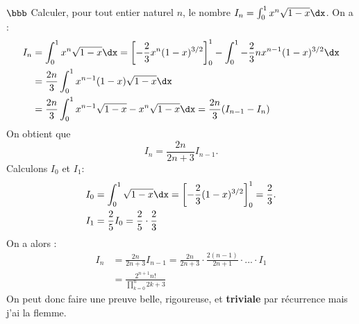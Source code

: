 \documentclass[11pt]{article}
\begin{document}
\begin{exercice}{$\bbb$}{}
    Calculer, pour tout entier naturel $n$, le nombre $I_n=\int_0^1{x^n\sqrt{1-x}\dx}$.
    \tcblower
    On a :
    \begin{align*}
        I_n &= \int_0^1x^n\sqrt{1-x}\dx=\left[-\frac{2}{3}x^n(1-x)^{3/2}\right]_0^1-\int_0^1{-\frac{2}{3}nx^{n-1}(1-x)^{3/2}\dx}\\
        &=\frac{2n}{3}\int_0^1{x^{n-1}(1-x)\sqrt{1-x}\dx}\\
        &=\frac{2n}{3}\int_0^1{x^{n-1}\sqrt{1-x} - x^n\sqrt{1-x}\dx} = \frac{2n}{3}(I_{n-1} - I_n)
    \end{align*}
    On obtient que
    \begin{equation*}
        I_n = \frac{2n}{2n+3}I_{n-1}.
    \end{equation*}
    Calculons $I_0$ et $I_1$:
    \begin{align*}
        &I_0 = \int_0^1{\sqrt{1-x}\dx} = \left[-\frac{2}{3}(1-x)^{3/2}\right]_0^1 = \frac{2}{3}.\\
        &I_1 = \frac{2}{5}I_0 = \frac{2}{5}\cdot\frac{2}{3}
    \end{align*}
    On a alors :
    \begin{align*}
        I_n &= \frac{2n}{2n+3}I_{n-1} = \frac{2n}{2n+3}\cdot\frac{2(n-1)}{2n+1}\cdot...\cdot I_1\\
        &= \frac{2^{n+1}n!}{\prod\limits_{k=0}^{n}{2k+3}}
    \end{align*}
    On peut donc faire une preuve belle, rigoureuse, et \textbf{triviale} par récurrence mais j'ai la flemme.
\end{exercice}
\end{document}
